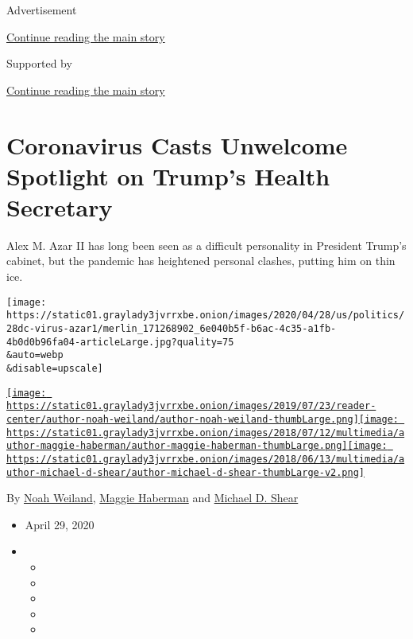 Advertisement

\protect\hyperlink{after-top}{Continue reading the main story}

Supported by

\protect\hyperlink{after-sponsor}{Continue reading the main story}

\hypertarget{coronavirus-casts-unwelcome-spotlight-on-trumps-health-secretary}{%
\section{Coronavirus Casts Unwelcome Spotlight on Trump's Health
Secretary}\label{coronavirus-casts-unwelcome-spotlight-on-trumps-health-secretary}}

Alex M. Azar II has long been seen as a difficult personality in
President Trump's cabinet, but the pandemic has heightened personal
clashes, putting him on thin ice.

\texttt{[image: https://static01.graylady3jvrrxbe.onion/images/2020/04/28/us/politics/28dc-virus-azar1/merlin\_171268902\_6e040b5f-b6ac-4c35-a1fb-4b0d0b96fa04-articleLarge.jpg?quality=75\\\&auto=webp\\\&disable=upscale]}

\href{https://www.nytimes3xbfgragh.onion/by/noah-weiland}{\texttt{[image: https://static01.graylady3jvrrxbe.onion/images/2019/07/23/reader-center/author-noah-weiland/author-noah-weiland-thumbLarge.png]}}\href{https://www.nytimes3xbfgragh.onion/by/maggie-haberman}{\texttt{[image: https://static01.graylady3jvrrxbe.onion/images/2018/07/12/multimedia/author-maggie-haberman/author-maggie-haberman-thumbLarge.png]}}\href{https://www.nytimes3xbfgragh.onion/by/michael-d-shear}{\texttt{[image: https://static01.graylady3jvrrxbe.onion/images/2018/06/13/multimedia/author-michael-d-shear/author-michael-d-shear-thumbLarge-v2.png]}}

By \href{https://www.nytimes3xbfgragh.onion/by/noah-weiland}{Noah
Weiland},
\href{https://www.nytimes3xbfgragh.onion/by/maggie-haberman}{Maggie
Haberman} and
\href{https://www.nytimes3xbfgragh.onion/by/michael-d-shear}{Michael D.
Shear}

\begin{itemize}
\item
  April 29, 2020
\item
  \begin{itemize}
  \item
  \item
  \item
  \item
  \item
  \end{itemize}
\end{itemize}

